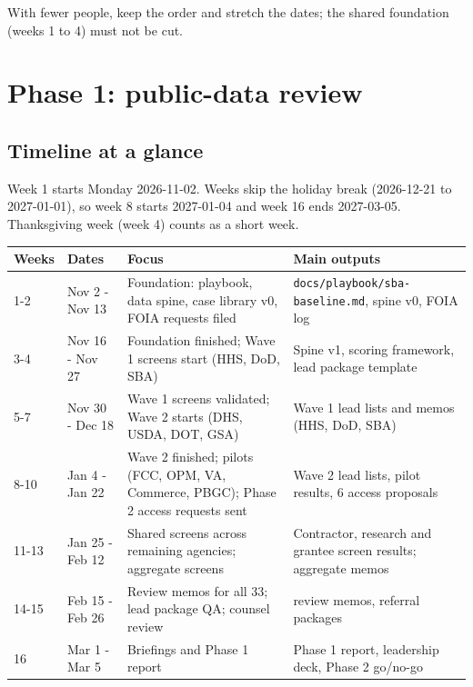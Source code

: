 \documentclass[letterpaper,11pt]{article}
\begin{document}
With fewer people, keep the order and stretch the dates; the shared
foundation (weeks 1 to 4) must not be cut.

\hypertarget{phase-1-public-data-review}{%
\section{Phase 1: public-data review}\label{phase-1-public-data-review}}

\hypertarget{timeline-at-a-glance}{%
\subsection{Timeline at a glance}\label{timeline-at-a-glance}}

Week 1 starts Monday 2026-11-02. Weeks skip the holiday break
(2026-12-21 to 2027-01-01), so week 8 starts 2027-01-04 and week 16 ends
2027-03-05. Thanksgiving week (week 4) counts as a short week.

\begingroup\small\setlength{\tabcolsep}{4pt}\renewcommand{\arraystretch}{1.25}
\begin{longtable}[l]{@{}l>{\raggedright\arraybackslash}p{}>{\raggedright\arraybackslash}p{}>{\raggedright\arraybackslash}p{}@{}}
\rowcolor{coolblack}\leavevmode\color{white}\bfseries Weeks & \leavevmode\color{white}\bfseries Dates & \leavevmode\color{white}\bfseries Focus & \leavevmode\color{white}\bfseries Main outputs \\
\endhead
1-2 & Nov 2 - Nov 13 & Foundation: playbook, data spine, case library v0, FOIA requests filed & \texttt{docs/playbook/sba-baseline.md}, spine v0, FOIA log \\
3-4 & Nov 16 - Nov 27 & Foundation finished; Wave 1 screens start (HHS, DoD, SBA) & Spine v1, scoring framework, lead package template \\
5-7 & Nov 30 - Dec 18 & Wave 1 screens validated; Wave 2 starts (DHS, USDA, DOT, GSA) & Wave 1 lead lists and memos (HHS, DoD, SBA) \\
8-10 & Jan 4 - Jan 22 & Wave 2 finished; pilots (FCC, OPM, VA, Commerce, PBGC); Phase 2 access requests sent & Wave 2 lead lists, pilot results, 6 access proposals \\
11-13 & Jan 25 - Feb 12 & Shared screens across remaining agencies; aggregate screens & Contractor, research and grantee screen results; aggregate memos \\
14-15 & Feb 15 - Feb 26 & Review memos for all 33; lead package QA; counsel review & 33 review memos, referral packages \\
16 & Mar 1 - Mar 5 & Briefings and Phase 1 report & Phase 1 report, leadership deck, Phase 2 go/no-go \\
\end{longtable}\endgroup
\end{document}
